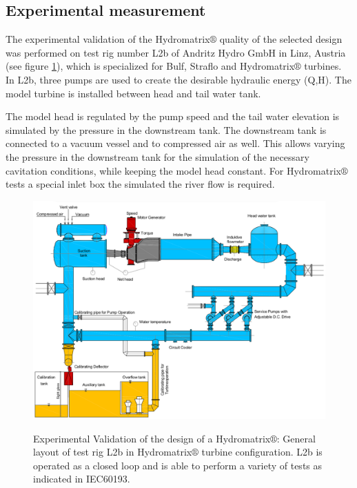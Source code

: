 \FloatBarrier
\subsection{Experimental measurement}  
The experimental validation of the Hydromatrix$\circledR$ quality of the selected design was performed on test rig number L2b of Andritz Hydro GmbH in Linz, Austria (see figure \ref{exp.lab}), which is specialized for Bulf, Straflo and Hydromatrix$\circledR$ turbines. In L2b, three pumps are used to create the desirable hydraulic energy (Q,H).  The model turbine is installed between head and tail water tank.

The model head is regulated by the pump speed and the tail
water elevation is simulated by the pressure in the downstream tank. The downstream tank is connected to a vacuum vessel and to compressed air as well. This allows varying the pressure in the downstream tank for the simulation of the necessary cavitation conditions, while keeping the model head constant. For Hydromatrix$\circledR$ tests a special inlet box the simulated the river flow is required.

\begin{figure}[h!]
\centering
\resizebox*{15.0cm}{!}
{\includegraphics[width=1\textwidth]{lab.eps}}
\caption{Experimental Validation of the design of a Hydromatrix$\circledR$: General layout of test rig L2b in Hydromatrix$\circledR$ turbine configuration.
L2b is operated as a closed loop and is able to perform a variety of tests as indicated in IEC60193.}
\label{exp.lab}
\end{figure}

